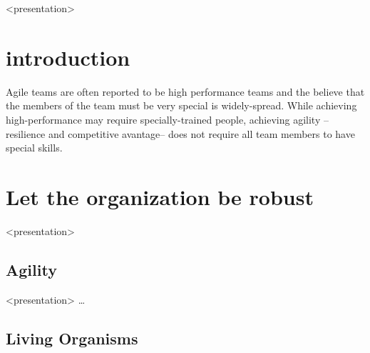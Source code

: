 
%

\begin{frame}[t,plain]
  \maketitle
\end{frame}

\begin{frame}<presentation>
  \tableofcontents
\end{frame}

\section{introduction}
\mode*

Agile teams are often reported to be high performance teams and the believe that the members of the team must be very special is widely-spread. While achieving high-performance may require specially-trained people, achieving agility --resilience and competitive avantage-- does not require all team members to have special skills.

\section{Let the organization be robust}

  \begin{frame}<presentation>
    \tableofcontents[currentsection]
  \end{frame}

%
\subsection{Agility}

  \begin{frame}<presentation>%
    \dots
  \end{frame}

%
\subsection{Living Organisms}

